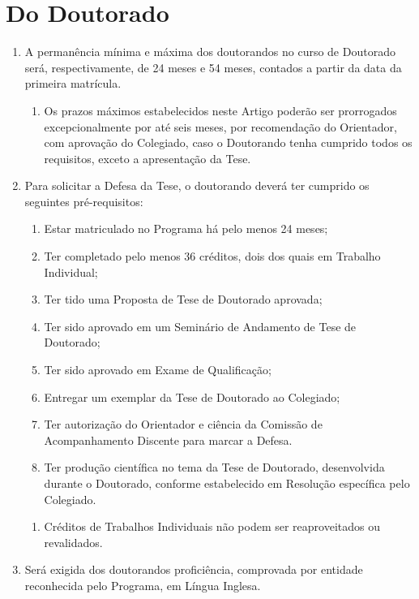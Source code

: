 \documentclass{article}
\newcommand{\singleitem}{\item[Parágrafo Único.]}
\begin{document}
\section{Do Doutorado}
\begin{enumerate}
	\item  A permanência mínima e máxima dos doutorandos no curso de Doutorado será, respectivamente, de 24 meses e 54 meses, contados a partir da data da primeira matrícula.
	\begin{enumerate}
		\singleitem Os prazos máximos estabelecidos neste Artigo poderão ser prorrogados excepcionalmente por até seis meses, por recomendação do Orientador, com aprovação do Colegiado, caso o Doutorando tenha cumprido todos os requisitos, exceto a apresentação da Tese.
	\end{enumerate}
	
	\item Para solicitar a Defesa da Tese, o doutorando deverá ter cumprido os seguintes pré-requisitos:
	\begin{enumerate}[label=\Roman*]
		\item	Estar matriculado no Programa há pelo menos 24 meses;
		\item	Ter completado pelo menos 36 créditos, dois dos quais em Trabalho Individual;
		\item	Ter tido uma Proposta de Tese de Doutorado aprovada;
		\item	Ter sido aprovado em um Seminário de Andamento de Tese de Doutorado;
		\item	Ter sido aprovado em Exame de Qualificação;
		\item	Entregar um exemplar da Tese de Doutorado ao Colegiado;
		\item	Ter autorização do Orientador e ciência da Comissão de Acompanhamento Discente para marcar a Defesa.
		\item	Ter produção científica no tema da Tese de Doutorado, desenvolvida durante o Doutorado, conforme estabelecido em Resolução específica pelo Colegiado.
	\end{enumerate}
	\begin{enumerate}
		\singleitem Créditos de Trabalhos Individuais não podem ser reaproveitados ou revalidados.
	\end{enumerate}

	\item  Será exigida dos doutorandos proficiência, comprovada por entidade reconhecida pelo Programa, em Língua Inglesa.


\end{enumerate}
\end{document}

